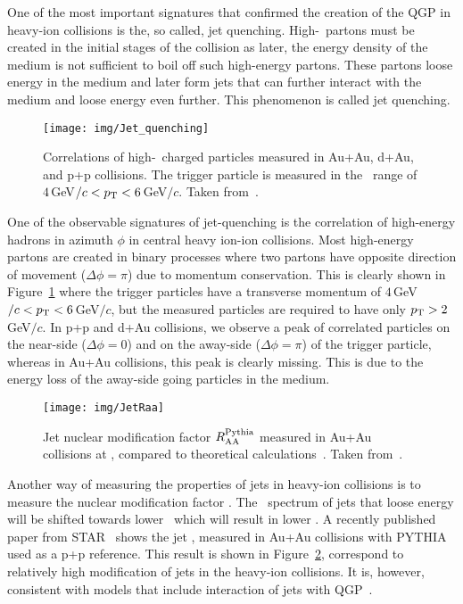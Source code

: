 One of the most important signatures that confirmed the creation of the QGP in heavy-ion collisions is the, so called, jet quenching. High-\pt\ partons must be created in the initial stages of the collision as later, the energy density of the medium is not sufficient to boil off such high-energy partons. These partons loose energy in the medium and later form jets that can further interact with the medium and loose energy even further. This phenomenon is called jet quenching.

\begin{figure}[!htb]
\centering
\texttt{[image: img/Jet\_quenching]}
\caption[Correlations of high-\pt\ charged particles measured in Au+Au, d+Au, and p+p collisions.]{\label{jetQuenching}Correlations of high-\pt\ charged particles measured in Au+Au, d+Au, and p+p collisions. The trigger particle is measured in the \pt\ range of $4\,$GeV$/c < {p_{\mathrm{T}}} < 6\,$GeV$/c$\@. Taken from~\cite{jetQuenching }\@.}

\end{figure}


One of the observable signatures of jet-quenching is the correlation of high-energy hadrons in azimuth $\phi$ in central heavy ion-ion collisions. Most high-energy partons are created in binary processes where two partons have opposite direction of movement ($\Delta\phi = \pi$) due to momentum conservation. This is clearly shown in Figure~\ref{jetQuenching} where the trigger particles have a transverse momentum of $4\,$GeV$/c < {p_{\mathrm{T}}} < 6\,$GeV$/c$, but the measured particles are required to have only ${p_{\mathrm{T}}} > 2\,$GeV$/c$\@. In p+p and d+Au collisions, we observe a peak of correlated particles on the near-side ($\Delta \phi = 0$) and on the away-side ($\Delta \phi = \pi$) of the trigger particle, whereas in Au+Au collisions, this peak is clearly missing. This is due to the energy loss of the away-side going particles in the medium.


\begin{figure}[!htb]
\centering
\texttt{[image: img/JetRaa]}
\caption[Jet nuclear modification factor $\Raa^\mathrm{Pythia}$ measured in Au+Au collisions at \snnFull.]{\label{jetRaa}Jet nuclear modification factor $\Raa^\mathrm{Pythia}$ measured in Au+Au collisions at \snnFull, compared to theoretical calculations~\cite{JetRaaNLOinitialState, JetRaaSCET1,JetRaaSCET2, JetRaaHybrid,JetRaaLBT1, JetRaaLBT2}. Taken from~\cite{RusyPaper}\@.}

\end{figure}

Another way of measuring the properties of jets in heavy-ion collisions is to measure the nuclear modification factor \Raa\@. The \pt\ spectrum of jets that loose energy will be shifted towards lower \pt\ which will result in lower \Raa\@. A recently published paper from STAR~\cite{RusyPaper} shows the jet \Raa, measured in Au+Au collisions with PYTHIA~\cite{PYTHIA} used as a p+p reference. This result is shown in Figure~\ref{jetRaa}, correspond to relatively high modification of jets in the heavy-ion collisions. It is, however, consistent with models that include interaction of jets with QGP~\cite{JetRaaNLOinitialState, JetRaaSCET1,JetRaaSCET2, JetRaaHybrid,JetRaaLBT1, JetRaaLBT2}\@.
